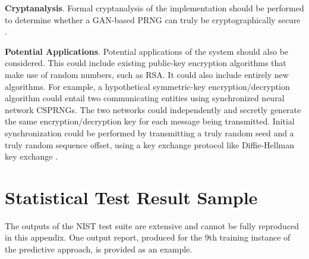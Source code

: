 \documentclass[12pt, titlepage]{report}
\theoremstyle{definition}
\begin{document}
\textbf{Cryptanalysis}. Formal cryptanalysis of the implementation should be performed to determine whether a GAN-based PRNG can truly be cryptographically secure \cite[Abstract]{rukhin2001statistical}. 

\textbf{Potential Applications}. Potential applications of the system should also be considered. This could include existing public-key encryption algorithms that make use of random numbers, such as RSA. It could also include entirely new algorithms. For example, a hypothetical symmetric-key encryption/decryption algorithm could entail two communicating entities using synchronized neural network CSPRNGs. The two networks could independently and secretly generate the same encryption/decryption key for each message being transmitted. Initial synchronization could be performed by transmitting a truly random seed and a truly random sequence offset, using a key exchange protocol like Diffie-Hellman key exchange \cite[p. 174-177]{anderson2010security}.










\appendix
\chapter{Statistical Test Result Sample}\label{appendix:sample}
The outputs of the NIST test suite are extensive and cannot be fully reproduced in this appendix. One output report, produced for the 9th training instance of the predictive approach, is provided as an example.
\end{document}
